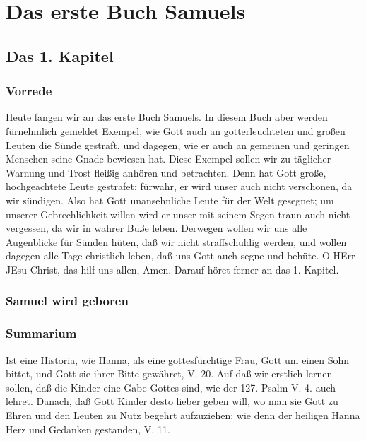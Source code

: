 
\part{Das erste Buch Samuels}

\chapter{Das 1. Kapitel}

\section{Vorrede}

Heute fangen wir an das erste Buch Samuels. In diesem Buch aber werden fürnehmlich gemeldet Exempel, wie Gott auch an gotterleuchteten und großen Leuten die Sünde gestraft, und dagegen, wie er auch an gemeinen und geringen Menschen seine Gnade bewiesen hat. Diese Exempel sollen wir zu täglicher Warnung und Trost fleißig anhören und betrachten. Denn hat Gott große, hochgeachtete Leute gestrafet; fürwahr, er wird unser auch nicht verschonen, da wir sündigen. Also hat Gott unansehnliche Leute für der Welt gesegnet; um unserer Gebrechlichkeit willen wird er unser mit seinem Segen traun auch nicht vergessen, da wir in wahrer Buße leben. Derwegen wollen wir uns alle Augenblicke für Sünden hüten, daß wir nicht straffschuldig werden, und wollen dagegen alle Tage christlich leben, daß uns Gott auch segne und behüte. O HErr JEsu Christ, das hilf uns allen, Amen. Darauf höret ferner an das 1. Kapitel.

\section{Samuel wird geboren}

\section{Summarium}

Ist eine Historia, wie Hanna, als eine gottesfürchtige Frau, Gott um einen Sohn bittet, und Gott sie ihrer Bitte gewähret, V. 20. Auf daß wir erstlich lernen sollen, daß die Kinder eine Gabe Gottes sind, wie der 127. Psalm V. 4. auch lehret. Danach, daß Gott Kinder desto lieber geben will, wo man sie Gott zu Ehren und den Leuten zu Nutz begehrt aufzuziehen; wie denn der heiligen Hanna Herz und Gedanken gestanden, V. 11.

